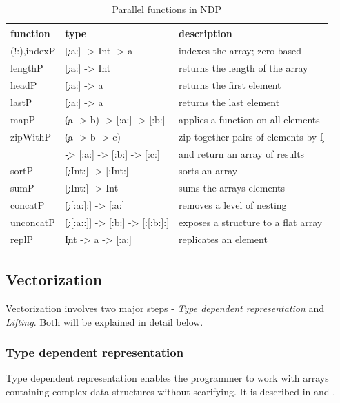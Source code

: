   \begin{table}[h]
    \caption{Parallel functions in NDP}
    \label{table:parfuns}
    \begin{tabular}{lll}
        \toprule
        function & type & description \\
        \midrule
        (!:),indexP & \c{[:a:] -> Int -> a} & indexes the array; zero-based \\
        lengthP & \c{[:a:] -> Int} & returns the length of the array \\
        headP & \c{[:a:] -> a} & returns the first element\\
        lastP & \c{[:a:] -> a} & returns the last element \\
        mapP & \c{(a -> b) -> [:a:] -> [:b:]} & applies a function on all elements \\
        zipWithP & \c{(a -> b -> c)} & zip together pairs of elements by \c{f} \\
         & \c{-> [:a:] -> [:b:] -> [:c:]} & and return an array of results \footnotemark \\
        sortP & \c{[:Int:] -> [:Int:]} & sorts an array \\
        sumP & \c{[:Int:] -> Int} & sums the arrays elements \\
        concatP & \c{[:[:a:]:] -> [:a:]} & removes a level of nesting \\
        unconcatP & \c{[:[:a::]] -> [:b:] -> [:[:b:]:]} & exposes a structure to a flat array \\
        replP & \c{Int -> a -> [:a:]} & replicates an element \\
    \end{tabular}
  \end{table}
  \subsection{Vectorization}
    Vectorization involves two major steps -
    \emph{Type dependent representation} and \emph{Lifting}.
    Both will be explained in detail below.
    
    \subsubsection{Type dependent representation}

      Type dependent representation enables the programmer
      to work with arrays containing complex
      data structures without scarifying.
      It is described in 
      \cite{FastArr2003Chakravarty}
      and \cite{DataFamily2005Chakravarty}.
      
